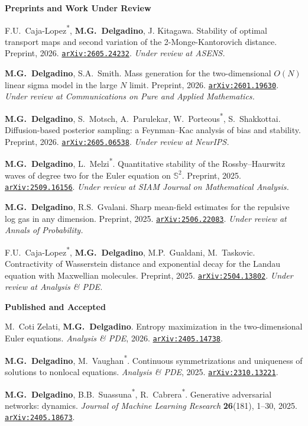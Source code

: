 \documentclass[11pt]{article}
\newcommand{\pub}[2]{%
  \par\addvspace{0.5ex}\noindent
  \begin{list}{}{%
    \setlength{\leftmargin}{2.4em}%
    \setlength{\labelwidth}{2.4em}%
    \setlength{\labelsep}{0.3em}%
  }%
  \item[{[#1]}] #2
  \end{list}
}
\newcommand{\arxiv}[1]{\href{https://arxiv.org/abs/#1}{\texttt{arXiv:#1}}}
\begin{document}
\noindent\textbf{Preprints and Work Under Review}\\[0.3em]

\pub{27}{F.U.~Caja-Lopez\textsuperscript{*}, \textbf{M.G.~Delgadino}, J. Kitagawa. Stability of optimal transport maps and second variation of the 2-Monge-Kantorovich distance. Preprint, 2026. \arxiv{2605.24232}. \emph{Under review at ASENS.}}

\pub{26}{\textbf{M.G.~Delgadino}, S.A.~Smith. Mass generation for the two-dimensional $O(N)$ linear sigma model in the large $N$ limit. Preprint, 2026. \arxiv{2601.19630}. \emph{Under review at Communications on Pure and Applied Mathematics.}}

\pub{25}{\textbf{M.G.~Delgadino}, S.~Motsch, A.~Parulekar, W.~Porteous\textsuperscript{*}, S.~Shakkottai. Diffusion-based posterior sampling: a Feynman--Kac analysis of bias and stability. Preprint, 2026. \arxiv{2605.06538}. \emph{Under review at NeurIPS.}}

\pub{24}{\textbf{M.G.~Delgadino}, L.~Melzi\textsuperscript{*}. Quantitative stability of the Rossby--Haurwitz waves of degree two for the Euler equation on $\mathbb{S}^2$. Preprint, 2025. \arxiv{2509.16156}. \emph{Under review at SIAM Journal on Mathematical Analysis.}}

\pub{23}{\textbf{M.G.~Delgadino}, R.S.~Gvalani. Sharp mean-field estimates for the repulsive log gas in any dimension. Preprint, 2025. \arxiv{2506.22083}. \emph{Under review at Annals of Probability.}}

\pub{22}{F.U.~Caja-Lopez\textsuperscript{*}, \textbf{M.G.~Delgadino}, M.P.~Gualdani, M.~Taskovic. Contractivity of Wasserstein distance and exponential decay for the Landau equation with Maxwellian molecules. Preprint, 2025. \arxiv{2504.13802}. \emph{Under review at Analysis \& PDE.}}

\vspace{0.8em}\noindent\textbf{Published and Accepted}\\[0.3em]

\pub{21}{M.~Coti Zelati, \textbf{M.G.~Delgadino}. Entropy maximization in the two-dimensional Euler equations. \emph{Analysis \& PDE}, 2026. \arxiv{2405.14738}.}

\pub{20}{\textbf{M.G.~Delgadino}, M.~Vaughan\textsuperscript{*}. Continuous symmetrizations and uniqueness of solutions to nonlocal equations. \emph{Analysis \& PDE}, 2025. \arxiv{2310.13221}.}

\pub{19}{\textbf{M.G.~Delgadino}, B.B.~Suassuna\textsuperscript{*}, R.~Cabrera\textsuperscript{*}. Generative adversarial networks: dynamics. \emph{Journal of Machine Learning Research} \textbf{26}(181), 1--30, 2025. \arxiv{2405.18673}.}
\end{document}
